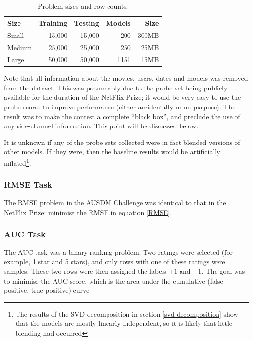 \documentclass{article}
\begin{document}
\begin{table}[t]
\caption{Problem sizes and row counts.}
\label{problems}
\vskip 0.15in
\begin{center}
\begin{small}
\begin{sc}
\begin{tabular}{lrrrr}
\hline
\abovespace\belowspace
Size & Training & Testing & Models & Size \\
\hline
\abovespace
Small    & 15,000 & 15,000 & 200 & 300MB \\
Medium   & 25,000 & 25,000 & 250 &  25MB \\
\belowspace
Large    & 50,000 & 50,000 & 1151 & 15MB \\
\hline
\end{tabular}
\end{sc}
\end{small}
\end{center}
\vskip -0.1in
\end{table}

Note that all information about the movies, users, dates and models was removed from the dataset.  This was presumably due to the probe set being publicly available for the duration of the NetFlix Prize; it would be very easy to use the probe scores to improve performance (either accidentally or on purpose).  The result was to make the contest a complete ``black box'', and preclude the use of any side-channel information.  This point will be discussed below.

It is unknown if any of the probe sets collected were in fact blended versions of other models.  If they were, then the baseline results would be artificially inflated\footnote{The results of the SVD decomposition in section \ref{svd-decomposition} show that the models are mostly linearly independent, so it is likely that little blending had occurred}.

\subsubsection{RMSE Task}

The RMSE problem in the AUSDM Challenge was identical to that in the NetFlix Prize: minimise the RMSE in equation \ref{RMSE}.

\subsubsection{AUC Task}

The AUC task was a binary ranking problem.  Two ratings were selected (for example, 1 star and 5 stars), and only rows with one of these ratings were samples.  These two rows were then assigned the labels $+1$ and $-1$.  The goal was to minimise the AUC score, which is the area under the cumulative (false positive, true positive) curve.
\end{document}
